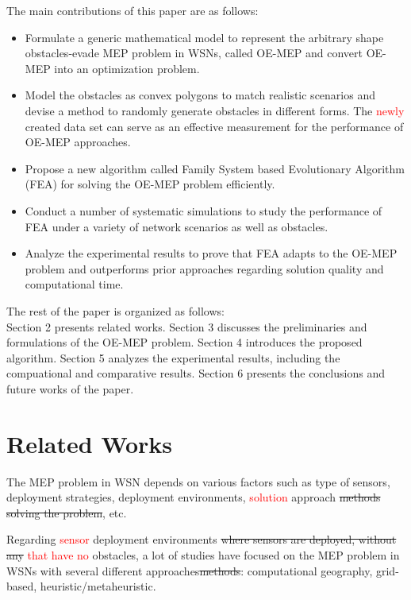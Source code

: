 \documentclass[final]{elsarticle}
\begin{document}
The main contributions of this paper are as follows:
\begin{itemize}
	\itemsep0em
	\item Formulate a generic mathematical model to represent the arbitrary shape obstacles-evade MEP problem in WSNs, called OE-MEP and convert OE-MEP into an optimization problem.
	\item Model the obstacles as convex polygons to match realistic scenarios and devise a method to randomly generate obstacles in different forms. The \textcolor{red}{newly} created data set can serve as an effective measurement for the performance of OE-MEP approaches.  
	\item Propose a new algorithm called Family System based Evolutionary Algorithm (FEA) for solving the OE-MEP problem efficiently. 
	\item Conduct a number of systematic simulations to study the performance of FEA under a variety of network scenarios as well as obstacles.
	\item Analyze the experimental results to prove that FEA adapts to the OE-MEP problem and outperforms prior approaches regarding solution quality and computational time.	
\end{itemize}
The rest of the paper is organized as follows:\\
Section 2 presents related works. Section 3 discusses the preliminaries and formulations of the OE-MEP problem. Section 4 introduces the proposed algorithm. Section 5 analyzes the experimental results, including the compuational and comparative results. Section 6 presents the conclusions and future works of the paper.\\
\section{Related Works}
The MEP problem in WSN depends on various factors such as type of sensors, deployment strategies, deployment environments, \textcolor{red}{solution} approach \sout{methods solving the problem}, etc. 

Regarding \textcolor{red}{sensor} deployment environments \sout{where sensors are deployed, without any} \textcolor{red}{that have no} obstacles, a lot of studies have focused on the MEP problem in WSNs with several different approaches\sout{methods}: computational geography, grid-based, heuristic/metaheuristic.
\end{document}
